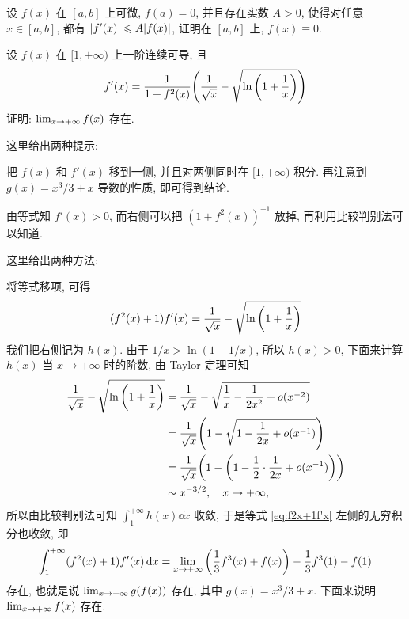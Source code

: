 \begin{exercise}[series=exer]
    \item 设 $ f(x) $ 在 $ [a, b] $ 上可微, $ f(a) = 0 $, 并且存在实数 $ A > 0 $, 使得对任意 $ x \in [a, b] $, 都有 $ \abs{f'(x)} \leqslant A \abs{f(x)} $, 证明在 $ [a, b] $ 上, $ f(x) \equiv 0 $. 
    \item 设 $ f(x) $ 在 $ [1, +\infty) $ 上一阶连续可导, 且
    \begin{align*}
        f'(x) = \frac{1}{1 + f^{2}(x)}\qty(\frac{1}{\sqrt{x}} - \sqrt{\ln\qty(1 + \frac{1}{x})})
    \end{align*}
    证明: $ \lim_{x \to +\infty}f(x) $ 存在.
    \begin{hint}
        这里给出两种提示:
        \begin{method}
        \item 把 $ f(x) $ 和 $ f'(x) $ 移到一侧, 并且对两侧同时在 $ [1, +\infty) $ 积分. 再注意到 $ g(x) = x^{3}/3 + x $ 导数的性质, 即可得到结论.
        \item 由等式知 $ f'(x) > 0 $, 而右侧可以把 $ (1 + f^{2}(x))^{-1} $ 放掉, 再利用比较判别法可以知道. 
        \end{method}
    \end{hint}
    \begin{answer}
        这里给出两种方法:
        \begin{method}
            \item\label{method:移项积分} 将等式移项, 可得
            \begin{align}\label{eq:f2x+1f'x}
                (f^{2}(x) + 1)f'(x) = \frac{1}{\sqrt{x}} - \sqrt{\ln\qty(1 + \frac{1}{x})}
            \end{align}
            我们把右侧记为 $ h(x) $. 由于 $ 1/x > \ln(1 + 1/x) $, 所以 $ h(x) > 0 $, 下面来计算 $ h(x) $ 当 $ x \to +\infty $ 时的阶数, 由 Taylor 定理可知
            \begin{align*}
                \frac{1}{\sqrt{x}} - \sqrt{\ln\qty(1 + \frac{1}{x})} & = \frac{1}{\sqrt{x}} - \sqrt{\frac{1}{x} - \frac{1}{2x^{2}} + o(x^{-2})} \\
                & = \frac{1}{\sqrt{x}}\qty(1 - \sqrt{1 - \frac{1}{2x} + o(x^{-1})})\\
                & = \frac{1}{\sqrt{x}}\qty(1 - \qty(1 - \frac{1}{2} \cdot \frac{1}{2x} + o(x^{-1})))\\
                & \sim x^{-3/2}, \quad x \to +\infty,
            \end{align*}
            所以由比较判别法可知 $ \int_{1}^{+\infty} h(x) \dd{x} $ 收敛, 于是等式 \eqref{eq:f2x+1f'x} 左侧的无穷积分也收敛, 即
            \begin{align*}
                \int_{1}^{+\infty} (f^{2}(x) + 1)f'(x) \dd{x} = \lim_{x \to +\infty} \qty(\frac{1}{3}f^{3}(x) + f(x)) - \frac{1}{3}f^{3}(1) - f(1)
            \end{align*}
            存在, 也就是说 $ \lim_{x \to +\infty} g(f(x)) $ 存在, 其中 $ g(x) = x^{3}/3 + x $. 下面来说明 $ \lim_{x \to +\infty} f(x) $ 存在.


\end{method}
\end{answer}
\end{exercise}
